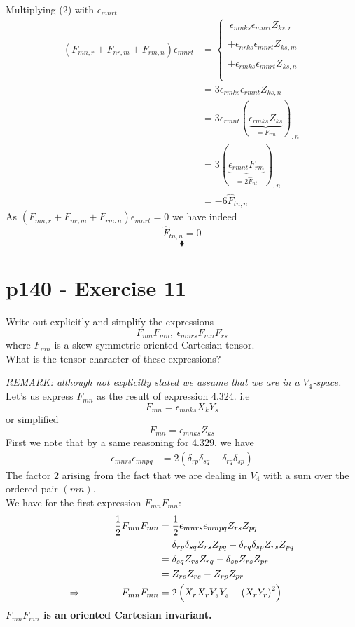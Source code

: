 Multiplying (2) with $\epsilon_{mnrt}$ 
\begin{align}
\left(F_{mn,r}+F_{nr,m}+F_{rm,n}\right)\epsilon_{mnrt}&=\left\{\begin{array}{l}
\ \epsilon_{mnks} \epsilon_{mnrt} Z_{ks,r}\\\\
+\epsilon_{nrks} \epsilon_{mnrt} Z_{ks,m}\\\\
+\epsilon_{rmks}\epsilon_{mnrt} Z_{ks,n}\\\\
\end{array}\right.\\
&=3\epsilon_{rmks}\epsilon_{rmnt} Z_{ks,n}\\
&=3\epsilon_{rmnt} \left(\underbrace{\epsilon_{rmks}Z_{ks}}_{=F_{rm}} \right)_{,n}\\
&=3\left(\underbrace{\epsilon_{rmnt} F_{rm}}_{=2\hat{F}_{nt}}  \right)_{,n}\\
&=-6\hat{F}_{tn,n}
\end{align}
As $\left(F_{mn,r}+F_{nr,m}+F_{rm,n}\right)\epsilon_{mnrt}=0$ we have indeed $$\hat{F}_{tn,n}=0$$
$$\blacklozenge$$
\newpage

\section{p140 - Exercise 11}
\begin{tcolorbox}
Write out explicitly and simplify the expressions $$F_{mn}F_{mn}, \ \epsilon_{mnrs} F_{mn}F_{rs} $$ where  $F_{mn}$ is a skew-symmetric oriented Cartesian tensor.\\
What is the tensor character of these expressions?
\end{tcolorbox}
\textit{REMARK: although not explicitly stated we assume that we are in a $V_4$-space.}\\
Let's us express $F_{mn}$ as the result of expression $\mathbf{4.324.} $ i.e $$F_{mn} = \epsilon_{mnks} X_kY_s$$ or simplified $$F_{mn} = \epsilon_{mnks} Z_{ks}$$
First we note that by a same reasoning for $\mathbf{4.329.}$ we have
\begin{align}
\epsilon_{mnrs}\epsilon_{mnpq} &= 2\left(\delta_{rp}\delta_{sq}-\delta_{rq}\delta_{sp}\right)
\end{align} 
The factor $2$ arising from the fact that we are dealing in $V_4$ with a sum over the ordered pair $(mn)$.\\
 We have for the first  expression $F_{mn}F_{mn}$:
\begin{align}
\frac{1}{2} F_{mn}F_{mn}&=\frac{1}{2}\epsilon_{mnrs}\epsilon_{mnpq} Z_{rs} Z_{pq}\\
&=\delta_{rp}\delta_{sq}Z_{rs} Z_{pq}-\delta_{rq}\delta_{sp}Z_{rs} Z_{pq}\\
&=\delta_{sq}Z_{rs} Z_{rq}-\delta_{sp}Z_{rs} Z_{pr}\\
&=Z_{rs} Z_{rs}-Z_{rp} Z_{pr}\\
\Rightarrow \quad\quad\quad\quad F_{mn}F_{mn}&=2\left(X_r X_r Y_s Y_s - \left(X_r Y_r\right)^2\right)
\end{align}
\textbf{$F_{mn}F_{mn}$ is an oriented Cartesian invariant.}


